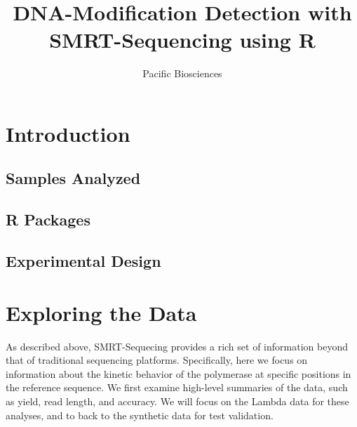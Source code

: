 \documentclass[letterpaper,12pt]{article}
\title{DNA-Modification Detection with SMRT-Sequencing using R}
\author{Pacific Biosciences}
\begin{document}
\maketitle

\section{Introduction}
\subsection{Samples Analyzed}
\subsection{R Packages}
\subsection{Experimental Design}

\section{Exploring the Data}
As described above, SMRT-Sequecing provides a rich set of information
beyond that of traditional sequencing platforms. Specifically, here we
focus on information about the kinetic behavior of the polymerase at
specific positions in the reference sequence. We first examine
high-level summaries of the data, such as yield, read length, and
accuracy. We will focus on the Lambda data for these analyses, and to
back to the synthetic data for test validation.
\end{document}
